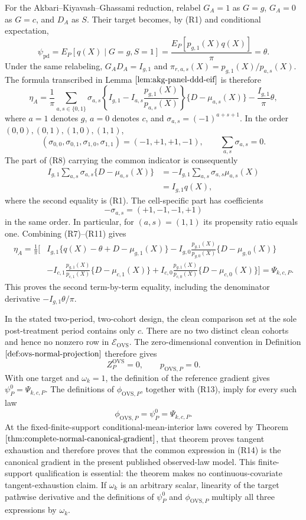 For the Akbari--Kiyavash--Ghassami reduction, relabel \(G_A=1\) as \(G=g\), \(G_A=0\) as \(G=c\), and \(D_A\) as \(S\).  Their target becomes, by (R1) and conditional expectation,
\[
\psi_{\mathrm{pd}}
=E_P[q(X)\mid G=g,S=1]
=\frac{E_P[p_{g,1}(X)q(X)]}{\pi}
=\theta.
\tag{R7}
\]
Under the same relabeling, \(G_AD_A=I_{g,1}\) and
\(\pi_{r,a,s}(X)=p_{g,1}(X)/p_{a,s}(X)\).  The formula transcribed in Lemma \(\ref{lem:akg-panel-ddd-eif}\) is therefore
\[
\eta_A
=\frac1\pi\sum_{a,s\in\{0,1\}}\sigma_{a,s}
\left\{I_{g,1}-I_{a,s}\frac{p_{g,1}(X)}{p_{a,s}(X)}\right\}
\{D-\mu_{a,s}(X)\}
-\frac{I_{g,1}}\pi\theta,
\tag{R8}
\]
where \(a=1\) denotes \(g\), \(a=0\) denotes \(c\), and \(\sigma_{a,s}=(-1)^{a+s+1}\).  In the order \((0,0),(0,1),(1,0),(1,1)\),
\[
(\sigma_{0,0},\sigma_{0,1},\sigma_{1,0},\sigma_{1,1})=(-1,+1,+1,-1),
\qquad \sum_{a,s}\sigma_{a,s}=0.
\tag{R9}
\]
The part of (R8) carrying the common indicator is consequently
\[
\begin{aligned}
I_{g,1}\sum_{a,s}\sigma_{a,s}\{D-\mu_{a,s}(X)\}
&=-I_{g,1}\sum_{a,s}\sigma_{a,s}\mu_{a,s}(X)\\
&=I_{g,1}q(X),
\end{aligned}
\tag{R10}
\]
where the second equality is (R1).  The cell-specific part has coefficients
\[
-\sigma_{a,s}=(+1,-1,-1,+1)
\tag{R11}
\]
in the same order.  In particular, for \((a,s)=(1,1)\) its propensity ratio equals one.  Combining (R7)--(R11) gives
\[
\begin{aligned}
\eta_A=\frac1\pi\bigg[&I_{g,1}\{q(X)-\theta+D-\mu_{g,1}(X)\}
-I_{g,0}\frac{p_{g,1}(X)}{p_{g,0}(X)}\{D-\mu_{g,0}(X)\}\\
&-I_{c,1}\frac{p_{g,1}(X)}{p_{c,1}(X)}\{D-\mu_{c,1}(X)\}
+I_{c,0}\frac{p_{g,1}(X)}{p_{c,0}(X)}\{D-\mu_{c,0}(X)\}\bigg]
=\Psi_{k,c,P}.
\end{aligned}
\tag{R12}
\]
This proves the second term-by-term equality, including the denominator derivative \(-I_{g,1}\theta/\pi\).

In the stated two-period, two-cohort design, the clean comparison set at the sole post-treatment period contains only \(c\).  There are no two distinct clean cohorts and hence no nonzero row in \(\mathcal E_{\mathrm{OVS}}\).  The zero-dimensional convention in Definition \(\ref{def:ovs-normal-projection}\) therefore gives
\[
Z_P^{\mathrm{OVS}}=0,
\qquad p_{\mathrm{OVS},P}=0.
\tag{R13}
\]
With one target and \(\omega_k=1\), the definition of the reference gradient gives \(\psi_P^0=\Psi_{k,c,P}\).  The definitions of \(\phi_{\mathrm{OVS},P}\), together with (R13), imply for every such law
\[
\phi_{\mathrm{OVS},P}=\psi_P^0=\Psi_{k,c,P}.
\tag{R14}
\]
At the fixed-finite-support conditional-mean-interior laws covered by Theorem \(\ref{thm:complete-normal-canonical-gradient}\), that theorem proves tangent exhaustion and therefore proves that the common expression in (R14) is the canonical gradient in the present published observed-law model.  This finite-support qualification is essential: the theorem makes no continuous-covariate tangent-exhaustion claim.  If \(\omega_k\) is an arbitrary scalar, linearity of the target pathwise derivative and the definitions of \(\psi_P^0\) and \(\phi_{\mathrm{OVS},P}\) multiply all three expressions by \(\omega_k\).

